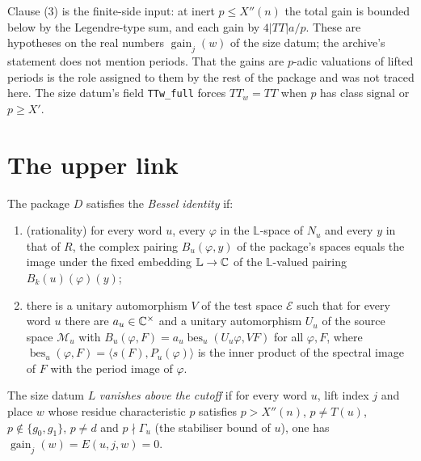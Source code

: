 \begin{remark}
Clause (3) is the finite-side input: at inert $p\le X''(n)$ the total gain is
bounded below by the Legendre-type sum, and each gain by $4|TT|a/p$. These are
hypotheses on the real numbers $\operatorname{gain}_j(w)$ of the size datum;
the archive's statement does not mention periods. That the gains are $p$-adic
valuations of lifted periods is the role assigned to them by the rest of the
package and was not traced here. The size datum's field \texttt{TTw\_full}
forces $TT_w=TT$ when $p$ has class $\mathrm{signal}$ or $p\ge X'$.
\end{remark}

\section{The upper link}

\begin{definition}\label{geob:bessel}
The package $D$ satisfies the \emph{Bessel identity} if:
\begin{enumerate}
\item (rationality) for every word $u$, every $\varphi$ in the $\mathbb L$-space
of $N_u$ and every $y$ in that of $R$, the complex pairing
$B_u(\varphi,y)$ of the package's spaces equals the image under the fixed
embedding $\mathbb L\to\mathbb{C}$ of the $\mathbb L$-valued pairing
$B_k(u)(\varphi)(y)$;
\item there is a unitary automorphism $V$ of the test space $\mathcal E$ such
that for every word $u$ there are $a_u\in\mathbb{C}^{\times}$ and a unitary
automorphism $U_u$ of the source space $\mathcal M_u$ with
$B_u(\varphi,F)=a_u\operatorname{bes}_u(U_u\varphi,VF)$ for all $\varphi,F$,
where $\operatorname{bes}_u(\varphi,F)=\langle s(F),P_u(\varphi)\rangle$ is the
inner product of the spectral image of $F$ with the period image of $\varphi$.
\end{enumerate}
\end{definition}

\begin{definition}\label{geob:zeroabove}
The size datum $L$ \emph{vanishes above the cutoff} if for every word $u$,
lift index $j$ and place $w$ whose residue characteristic $p$ satisfies
$p>X''(n)$, $p\ne T(u)$, $p\notin\{g_0,g_1\}$, $p\ne d$ and $p\nmid
\Gamma_u$ (the stabiliser bound of $u$), one has
$\operatorname{gain}_j(w)=E(u,j,w)=0$.
\end{definition}

